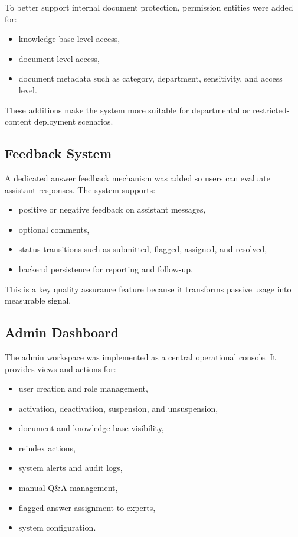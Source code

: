 \documentclass[12pt,a4paper]{report}
\begin{document}
To better support internal document protection, permission entities were added for:
\begin{itemize}[leftmargin=1.5em]
\item knowledge-base-level access,
\item document-level access,
\item document metadata such as category, department, sensitivity, and access level.
\end{itemize}

These additions make the system more suitable for departmental or restricted-content deployment scenarios.

\subsection{Feedback System}

A dedicated answer feedback mechanism was added so users can evaluate assistant responses. The system supports:
\begin{itemize}[leftmargin=1.5em]
\item positive or negative feedback on assistant messages,
\item optional comments,
\item status transitions such as submitted, flagged, assigned, and resolved,
\item backend persistence for reporting and follow-up.
\end{itemize}

This is a key quality assurance feature because it transforms passive usage into measurable signal.

\subsection{Admin Dashboard}

The admin workspace was implemented as a central operational console. It provides views and actions for:
\begin{itemize}[leftmargin=1.5em]
\item user creation and role management,
\item activation, deactivation, suspension, and unsuspension,
\item document and knowledge base visibility,
\item reindex actions,
\item system alerts and audit logs,
\item manual Q\&A management,
\item flagged answer assignment to experts,
\item system configuration.
\end{itemize}
\end{document}
